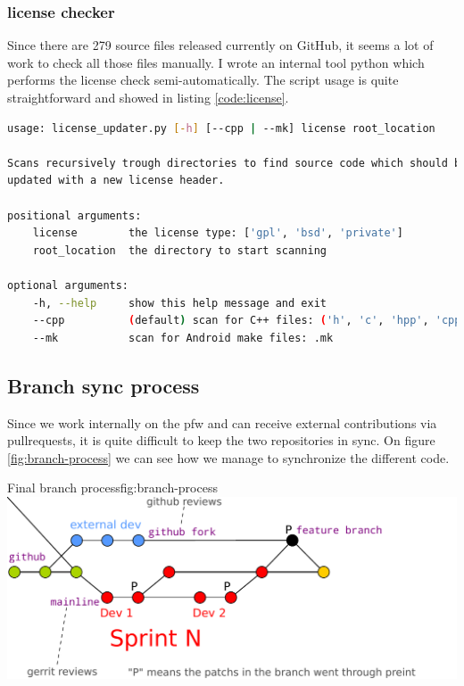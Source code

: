 \subsubsection{license checker}
Since there are 279 source files released currently on \gls{GitHub}, it seems a lot of
work to check all those files manually.
I wrote an internal tool \gls{python} which performs the license check semi-automatically.
The script usage is quite straightforward and showed in listing \ref{code:license}.

\begin{lstlisting}[language=bash, caption=License checker usage, label=code:license]
usage: license_updater.py [-h] [--cpp | --mk] license root_location

Scans recursively trough directories to find source code which should be
updated with a new license header.

positional arguments:
    license        the license type: ['gpl', 'bsd', 'private']
    root_location  the directory to start scanning

optional arguments:
    -h, --help     show this help message and exit
    --cpp          (default) scan for C++ files: ('h', 'c', 'hpp', 'cpp')
    --mk           scan for Android make files: .mk
\end{lstlisting}


\subsection{Branch sync process}
Since we work internally on the \gls{pfw} and can receive external contributions via \gls{pullrequests},
it is quite difficult to keep the two repositories in sync.
On figure \ref{fig:branch-process} we can see how we manage to synchronize the different code.

\begin{figureGraphics}{Final branch process}{fig:branch-process}
    \includegraphics[width=\textwidth]{./src/img/branches-process.pdf}
\end{figureGraphics}


